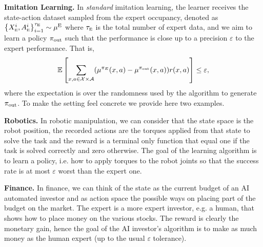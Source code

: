 \documentclass{article}
\begin{document}
\textbf{Imitation Learning.} In \emph{standard} imitation learning, the learner receives the state-action dataset sampled from the expert occupancy, denoted as $\left\{{X_{\scriptscriptstyle\textup{E}}^i,A_{\scriptscriptstyle\textup{E}}^i}\right\}^{\tau_{\scriptscriptstyle\textup{E}}}_{i=1} \sim \mu^{\operatorname{E}}$ where $\tau_{\scriptscriptstyle\textup{E}}$ is the total number of expert data, and we aim to learn a policy $\pi_{\mathrm{out}}$ such that the performance is close up to a precision $\varepsilon$ to the expert performance.
That is,
\begin{equation}
\mathbb{E}\left[{\sum_{x,a\in \mathcal{X}\times\mathcal{A}} (\mu^{{\pi_E}}(x,a) - \mu^{\pi_{\mathrm{out}}}(x,a))r(x,a)}\right] \leq \varepsilon, \label{eq:optgoal}
\end{equation}
where the expectation is over the randomness used by the algorithm to generate $\pi_{\mathrm{out}}$. To make the setting feel concrete we provide here two examples.
\begin{example}\textbf{Robotics.} In robotic manipulation, we can consider that the state space is the robot position, the recorded actions are the torques applied from that state to solve the task and 
the reward is a terminal only function that equal one if the task is solved correctly and zero otherwise.
The goal of the learning algorithm is to learn a policy, i.e. how to apply torques to the robot joints so that the success rate is at most $\varepsilon$ worst than the 
expert one.
\end{example}
\begin{example}\textbf{Finance.}
In finance, we can think of the state as the current budget of an AI automated investor and as action space the possible 
ways on placing part of the budget on the market. The expert is a more expert investor, e.g. a human, 
that shows how to place money on the various stocks. The reward is clearly the monetary gain, hence the goal of the AI investor's algorithm is to make as much money as the human expert (up to the usual $\varepsilon$ tolerance).
\end{example}
\end{document}
